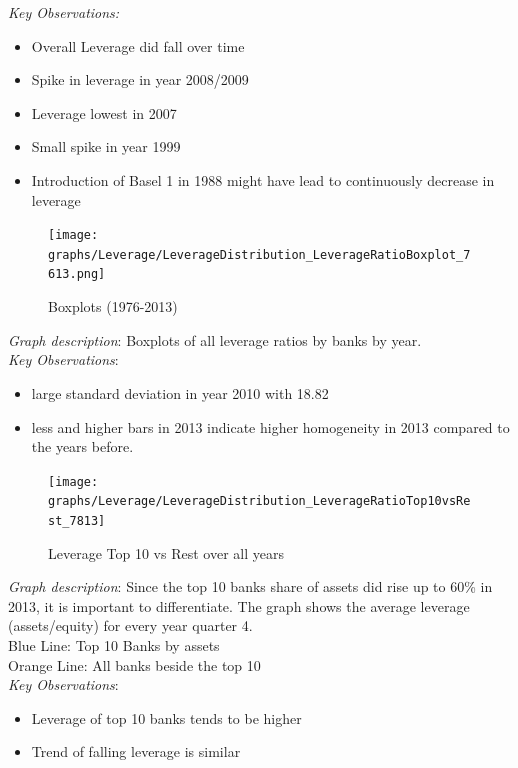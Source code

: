 \documentclass[12pt, a4paper]{article} %
\begin{document}
\noindent \textit{Key Observations:}
\begin{itemize}
\item Overall Leverage did fall over time
\item Spike in leverage in year 2008/2009
\item Leverage lowest in 2007
\item Small spike in year 1999
\item Introduction of Basel 1 in 1988 might have lead to continuously decrease in leverage
\end{itemize}

\begin{figure}[hbtp]
\centering
\caption{Boxplots (1976-2013)}
\texttt{[image: graphs/Leverage/LeverageDistribution\_LeverageRatioBoxplot\_7613.png]}
\end{figure}

\noindent \textit{Graph description}: Boxplots of all leverage ratios by banks by year. 
\\

\noindent \textit{Key Observations}:
\begin{itemize}
\item large standard deviation in year 2010 with 18.82
\item less and higher bars in 2013 indicate higher homogeneity in 2013 compared to the years before.
\end{itemize}



\iffalse
\begin{figure}[hbtp]
\centering
\caption{Leverage Top 10 vs Rest over all years}
\texttt{[image: graphs/Leverage/LeverageDistribution\_LeverageRatioTop10vsRest\_7813]}
\end{figure}


\newpage

\noindent \textit{Graph description}: Since the top 10 banks share of assets did rise up to 60\% in 2013, it is important to differentiate. The graph shows the average leverage (assets/equity) for every year quarter 4.\\ Blue Line: Top 10 Banks by assets\\
Orange Line: All banks beside the top 10\\

\noindent \textit{Key Observations}:
\begin{itemize}
\item Leverage of top 10 banks tends to be higher
\item Trend of falling leverage is similar
\end{itemize}
\end{document}
